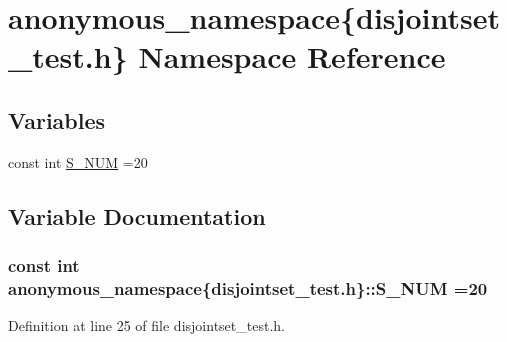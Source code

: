 \hypertarget{namespaceanonymous__namespace_02disjointset__test_8h_03}{}\section{anonymous\+\_\+namespace\{disjointset\+\_\+test.\+h\} Namespace Reference}
\label{namespaceanonymous__namespace_02disjointset__test_8h_03}
\subsection*{Variables}
\begin{DoxyCompactItemize}
\item 
const int \hyperlink{namespaceanonymous__namespace_02disjointset__test_8h_03_a9fd4f77b008da8d9816385f53c064001}{S\+\_\+\+N\+U\+M} =20
\end{DoxyCompactItemize}


\subsection{Variable Documentation}
\hypertarget{namespaceanonymous__namespace_02disjointset__test_8h_03_a9fd4f77b008da8d9816385f53c064001}{}
\subsubsection[{S\+\_\+\+N\+U\+M}]{\setlength{\rightskip}{0pt plus 5cm}const int anonymous\+\_\+namespace\{disjointset\+\_\+test.\+h\}\+::S\+\_\+\+N\+U\+M =20}\label{namespaceanonymous__namespace_02disjointset__test_8h_03_a9fd4f77b008da8d9816385f53c064001}


Definition at line 25 of file disjointset\+\_\+test.\+h.

